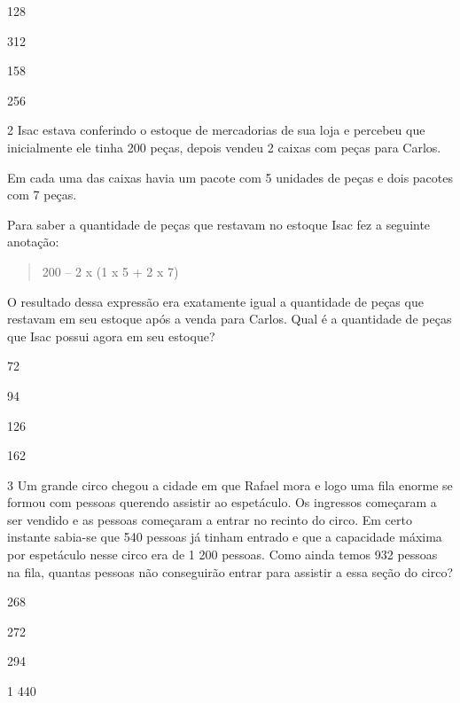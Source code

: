 \begin{escolha}
\item
  128
\item
  312
\item
  158
\item
  256
\end{escolha}


\num{2} Isac estava conferindo o estoque de mercadorias de sua loja e
percebeu que inicialmente ele tinha 200 peças, depois vendeu 2 caixas
com peças para Carlos.

Em cada uma das caixas havia um pacote com 5 unidades de peças e dois
pacotes com 7 peças.

Para saber a quantidade de peças que restavam no estoque Isac fez a
seguinte anotação:

\begin{quote}
200 -- 2 x (1 x 5 + 2 x 7)
\end{quote}

O resultado dessa expressão era exatamente igual a quantidade de peças
que restavam em seu estoque após a venda para Carlos. Qual é a
quantidade de peças que Isac possui agora em seu estoque?

\begin{escolha}
\item
  72
\item
  94
\item
  126
\item
  162
\end{escolha}


\num{3} Um grande circo chegou a cidade em que Rafael mora e logo uma fila
enorme se formou com pessoas querendo assistir ao espetáculo. Os
ingressos começaram a ser vendido e as pessoas começaram a entrar no
recinto do circo. Em certo instante sabia-se que 540 pessoas já tinham
entrado e que a capacidade máxima por espetáculo nesse circo era de 1
200 pessoas. Como ainda temos 932 pessoas na fila, quantas pessoas não
conseguirão entrar para assistir a essa seção do circo?

\begin{escolha}
\item
  268
\item
  272
\item
  294
\item
  1 440
\end{escolha}

